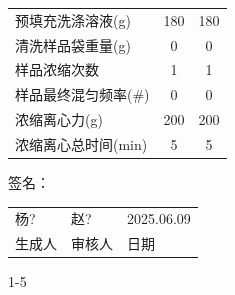 \documentclass[UTF8,10pt,a4paper,fontset=fandol]{ctexart}
\newcommand{\fieldvalue}[1]{#1}
\newcommand{\handwritten}[1]{#1}
\begin{document}
\begin{tabularx}{\textwidth}{@{}X c c@{}}
预填充洗涤溶液(g) &
\fieldvalue{180} &
\fieldvalue{180} \\

清洗样品袋重量(g) &
\fieldvalue{0} &
\fieldvalue{0} \\

样品浓缩次数 &
\fieldvalue{1} &
\fieldvalue{1} \\

样品最终混匀频率(\#) &
\fieldvalue{0} &
\fieldvalue{0} \\

浓缩离心力(g) &
\fieldvalue{200} &
\fieldvalue{200} \\

浓缩离心总时间(min) &
\fieldvalue{5} &
\fieldvalue{5}
\end{tabularx}

\vfill

签名：

\begin{tabularx}{\textwidth}{@{}X X X@{}}
\centering
\fieldvalue{\handwritten{杨?}}
&
\centering
\fieldvalue{\handwritten{赵?}}
&
\centering
\fieldvalue{\handwritten{2025.06.09}}
\arraybackslash \\[-0.25em]
\centering 生成人 & \centering 审核人 & \centering 日期 \arraybackslash \\
\end{tabularx}

\begin{flushright}
1-5
\end{flushright}
\end{document}
